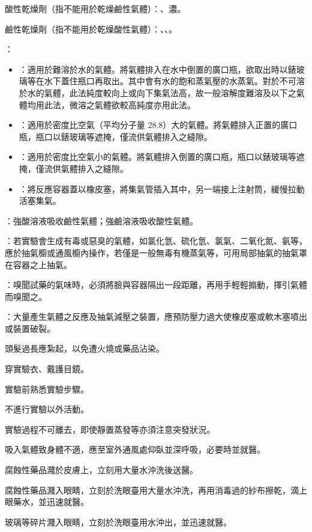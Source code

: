 \documentclass[a4paper,12pt]{article}
\begin{document}
\item 酸性乾燥劑（指不能用於乾燥鹼性氣體）：、濃。
\item 鹼性乾燥劑（指不能用於乾燥酸性氣體）：、、。
\eit
{}
\bit
\item {}：
\begin{itemize}
\item {}：適用於難溶於水的氣體。將氣體排入在水中倒置的廣口瓶，欲取出時以錶玻璃等在水下蓋住瓶口再取出。其中會有水的飽和蒸氣壓的水蒸氣。對於不可溶於水的氣體，此法純度較向上或向下集氣法高，故一般溶解度難溶及以下之氣體均用此法，微溶之氣體欲較高純度亦用此法。
\item {}：適用於密度比空氣（平均分子量 28.8）大的氣體。將氣體排入正置的廣口瓶，瓶口以錶玻璃等遮掩，僅流供氣體排入之縫隙。
\item {}：適用於密度比空氣小的氣體。將氣體排入倒置的廣口瓶，瓶口以錶玻璃等遮掩，僅流供氣體排入之縫隙。
\item {}：將反應容器蓋以橡皮塞，將集氣管插入其中，另一端接上注射筒，緩慢拉動活塞集氣。
\end{itemize}
\item {}：強酸溶液吸收鹼性氣體；強鹼溶液吸收酸性氣體。
\item {}：若實驗會生成有毒或惡臭的氣體，如氯化氫、硫化氫、氯氣、二氧化氮、氨等，應於抽氣櫥或通風櫥內操作，若僅是一般無毒有機蒸氣等，可用局部抽氣的抽氣罩在容器之上抽氣。
\item {}：嗅聞試藥的氣味時，必須將臉與容器隔出一段距離，再用手輕輕搧動，揮引氣體而嗅聞之。
\item {}：大量產生氣體之反應及抽氣減壓之裝置，應預防壓力過大使橡皮塞或軟木塞噴出或裝置破裂。
\eit
{}
\bit
\item 頭髮過長應紮起，以免遭火燒或藥品沾染。
\item 穿實驗衣、戴護目鏡。
\item 實驗前熟悉實驗步驟。
\item 不進行實驗以外活動。
\item 實驗過程不可離去，即使靜置蒸發等亦須注意突發狀況。
\item 吸入氣體致身體不適，應至室外通風處仰臥並深呼吸，必要時並就醫。
\item 腐蝕性藥品濺於皮膚上，立刻用大量水沖洗後送醫。
\item 腐蝕性藥品濺入眼睛，立刻於洗眼臺用大量水沖洗，再用消毒過的紗布擦乾，滴上眼藥水，並迅速就醫。
\item 玻璃等碎片濺入眼睛，立刻於洗眼臺用水沖出，並迅速就醫。
\end{document}
